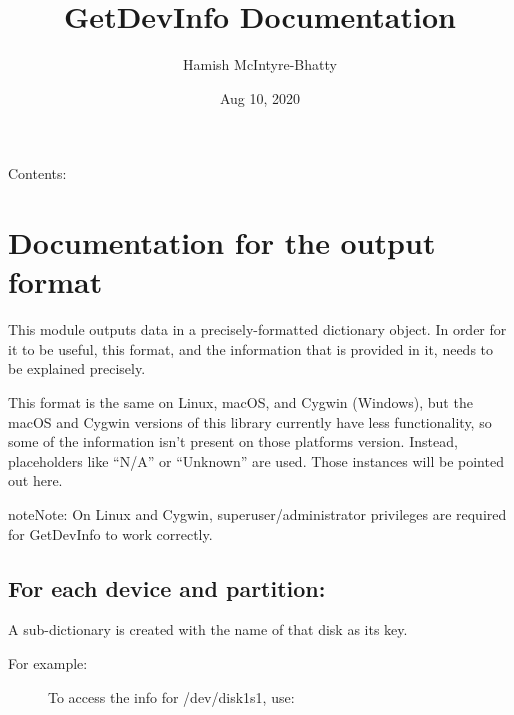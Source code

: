 \documentclass[letterpaper,10pt,english]{sphinxmanual}
\title{GetDevInfo Documentation}
\date{Aug 10, 2020}
\author{Hamish McIntyre-Bhatty}
\begin{document}
\pagestyle{empty}
\sphinxmaketitle
\pagestyle{plain}
\sphinxtableofcontents
\pagestyle{normal}
\label{\detokenize{index::doc}}


Contents:


\chapter{Documentation for the output format}
\label{\detokenize{format:documentation-for-the-output-format}}\label{\detokenize{format::doc}}
This module outputs data in a precisely-formatted dictionary object.
In order for it to be useful, this format, and the information that
is provided in it, needs to be explained precisely.

This format is the same on Linux, macOS, and Cygwin (Windows), but the
macOS and Cygwin versions of this library currently have less functionality,
so some of the information isn’t present on those platforms version. Instead,
placeholders like “N/A” or “Unknown” are used. Those instances will be pointed
out here.

\begin{sphinxadmonition}{note}{Note:}
On Linux and Cygwin, superuser/administrator privileges are required for
GetDevInfo to work correctly.
\end{sphinxadmonition}


\section{For each device and partition:}
\label{\detokenize{format:for-each-device-and-partition}}
A sub-dictionary is created with the name of that disk as its key.
\begin{description}
\item[{For example:}] \leavevmode
To access the info for /dev/disk1s1, use:

\begin{sphinxVerbatim}[commandchars=\\\{\}]
\PYG{p}{[}\PYG{p}{]}
\end{sphinxVerbatim}

\end{description}
\end{document}
